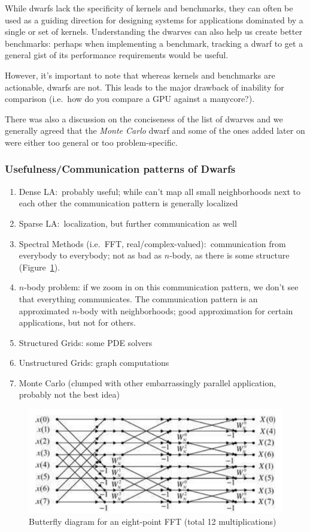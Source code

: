 While dwarfs lack the specificity of kernels and benchmarks, they can often be used as a guiding direction for designing systems for applications dominated by a single or set of kernels.
Understanding the dwarves can also help us create better benchmarks: perhaps when implementing a benchmark, tracking a dwarf to get a general gist of its performance requirements would be useful.

However, it's important to note that whereas kernels and benchmarks are actionable, dwarfs are not.
This leads to the major drawback of inability for comparison (i.e.\ how do you compare a GPU against a manycore?).

There was also a discussion on the conciseness of the list of dwarves and we generally agreed that the \textit{Monte Carlo} dwarf and some of the ones added later on were either too general or too problem-specific.

\subsubsection{Usefulness/Communication patterns of Dwarfs}

\begin{enumerate}
    \item Dense LA:\ probably useful; while can't map all small neighborhoods next to each other the communication pattern is generally localized
    \item Sparse LA:\ localization, but further communication as well
    \item Spectral Methods (i.e.\ FFT, real/complex-valued):\ communication from everybody to everybody; not as bad as \( n \)-body, as there is some structure (Figure~\ref{fig:butterfly}).
    \item \( n \)-body problem: if we zoom in on this communication pattern, we don't see that everything communicates.
    The communication pattern is an approximated \( n \)-body with neighborhoods; good approximation for certain applications, but not for others.
    \item Structured Grids: some PDE solvers
    \item Unstructured Grids: graph computations
    \item Monte Carlo (clumped with other embarrassingly parallel application, probably not the best idea)
\end{enumerate}

\begin{figure}
    \centering
    \includegraphics[width = 0.8\linewidth]{butterfly}
    \caption{Butterfly diagram for an eight-point FFT (total 12 multiplications)~\cite{DSP_Tan}}\label{fig:butterfly}
\end{figure}

{}



